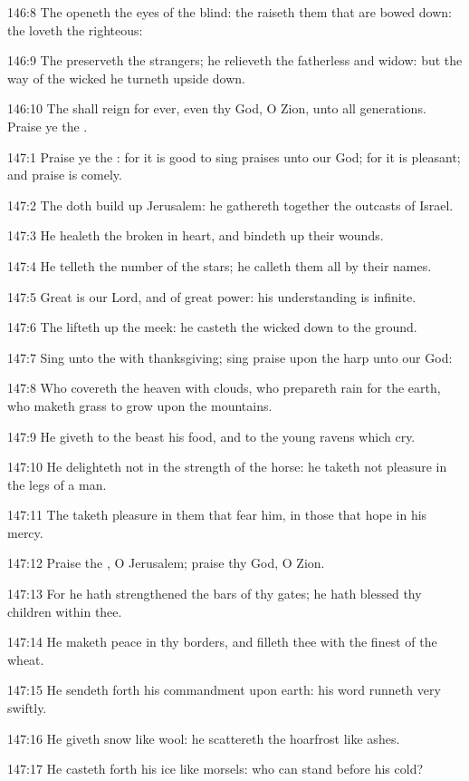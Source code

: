 146:8 The \LORD openeth the eyes of the blind: the \LORD raiseth them that are bowed down: the \LORD loveth the righteous:

146:9 The \LORD preserveth the strangers; he relieveth the fatherless and widow: but the way of the wicked he turneth upside down.

146:10 The \LORD shall reign for ever, even thy God, O Zion, unto all generations. Praise ye the \LORD.



147:1 Praise ye the \LORD: for it is good to sing praises unto our God; for it is pleasant; and praise is comely.

147:2 The \LORD doth build up Jerusalem: he gathereth together the outcasts of Israel.

147:3 He healeth the broken in heart, and bindeth up their wounds.

147:4 He telleth the number of the stars; he calleth them all by their names.

147:5 Great is our Lord, and of great power: his understanding is infinite.

147:6 The \LORD lifteth up the meek: he casteth the wicked down to the ground.

147:7 Sing unto the \LORD with thanksgiving; sing praise upon the harp unto our God:

147:8 Who covereth the heaven with clouds, who prepareth rain for the earth, who maketh grass to grow upon the mountains.

147:9 He giveth to the beast his food, and to the young ravens which cry.

147:10 He delighteth not in the strength of the horse: he taketh not pleasure in the legs of a man.

147:11 The \LORD taketh pleasure in them that fear him, in those that hope in his mercy.

147:12 Praise the \LORD, O Jerusalem; praise thy God, O Zion.

147:13 For he hath strengthened the bars of thy gates; he hath blessed thy children within thee.

147:14 He maketh peace in thy borders, and filleth thee with the finest of the wheat.

147:15 He sendeth forth his commandment upon earth: his word runneth very swiftly.

147:16 He giveth snow like wool: he scattereth the hoarfrost like ashes.

147:17 He casteth forth his ice like morsels: who can stand before his cold?

